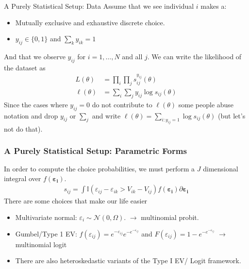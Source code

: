 \begin{frame}{A Purely Statistical Setup: Data}
Assume that we see individual $i$ makes a:
\begin{itemize}
\item Mutually exclusive and exhaustive discrete choice.
\item $y_{ij} \in \{0,1\}$ and $\sum_{k} y_{ik} =1$
\end{itemize}
 And that we observe $y_{ij}$ for $i=1,\ldots,N$ and all $j$. We can write the likelihood of the dataset as 
\begin{align*}
L(\theta) &= \prod_{i} \prod_j s_{ij}^{y_{ij}}(\theta)\\
\ell(\theta) &= \sum_{i} \sum_j y_{ij} \log   s_{ij}(\theta)
\end{align*}
Since the cases where $y_{ij}=0$ do not contribute to $\ell(\theta)$ some people abuse notation and drop $y_{ij}$ or $\sum_j$ and write $\ell(\theta) = \sum_{i: y_{ij}=1} \log s_{ij}(\theta)$ (but let's not do that).
\end{frame}


\begin{frame}
\frametitle{A Purely Statistical Setup: Parametric Forms}
In order to compute the choice probabilities, we must perform a $J$ dimensional integral over $f(\boldsymbol{\varepsilon_i})$.
\begin{align*}
s_{ij} =  \int \mathbb{I}( \varepsilon_{ij}-\varepsilon_{ik} > V_{ik} - V_{ij} ) f( \boldsymbol{\varepsilon_i}) \partial \boldsymbol{\varepsilon_i }
\end{align*}
There are some choices that make our life easier
\begin{itemize}
\item Multivariate normal: $\varepsilon_i  \sim \mathcal{N}(0,\Omega)$. $\longrightarrow$ \alert{ multinomial probit}.
 \item Gumbel/Type 1 EV: $f(\varepsilon_{ij}) = e^{-\varepsilon_{ij}}  e^{-e^{-\varepsilon_{ij}}}  $ and $F(\varepsilon_{ij}) = 1- e^{-e^{-\varepsilon_{ij}}}$ $\longrightarrow$ \alert{multinomial logit}
 \item There are also heteroskedastic variants of the Type I EV/ Logit framework.
\end{itemize}
\end{frame}

